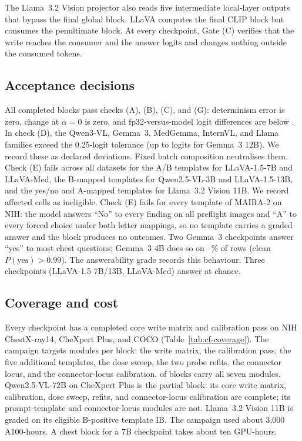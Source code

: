 \documentclass{article}
\begin{document}
The Llama~3.2 Vision projector also reads five intermediate local-layer outputs that bypass the final global block. LLaVA computes the final CLIP block but consumes the penultimate block. At every checkpoint, Gate (C) verifies that the write reaches the consumer and the answer logits and changes nothing outside the consumed tokens.

\subsection{Acceptance decisions}
\label{app:cf-gates}

All \cfWriteBlocks{} completed blocks pass checks (A), (B), (C), and (G): determinism error is zero, change at $\alpha=0$ is zero, and fp32-versus-model logit differences are below \cfGateFpMax{}. In check (D), the Qwen3-VL, Gemma~3, MedGemma, InternVL, and Llama families exceed the 0.25-logit tolerance (up to \cfGateBatchMax{} logits for Gemma~3 12B). We record these as declared deviations. Fixed batch composition neutralises them. Check (E) fails across all datasets for the A/B templates for LLaVA-1.5-7B and LLaVA-Med, the B-mapped templates for Qwen2.5-VL-3B and LLaVA-1.5-13B, and the yes/no and A-mapped templates for Llama~3.2 Vision 11B. We record affected cells as ineligible. Check (E) fails for every template of MAIRA-2 \citep{bannur2024maira} on NIH: the model answers ``No'' to every finding on all \cfSpecUngradedRows{} preflight images and ``A'' to every forced choice under both letter mappings, so no template carries a graded answer and the block produces no outcomes. Two Gemma~3 checkpoints answer ``yes'' to most chest questions; Gemma~3 4B does so on \cfGemmaFourYesMin--\cfGemmaFourYesMax\% of rows (clean $P(\mathrm{yes})>0.99$). The answerability grade records this behaviour. Three checkpoints (LLaVA-1.5 7B/13B, LLaVA-Med) answer at chance.

\subsection{Coverage and cost}
\label{app:cf-coverage}

Every checkpoint has a completed core write matrix and calibration pass on NIH ChestX-ray14, CheXpert Plus, and COCO (Table~\ref{tab:cf-coverage}). The campaign targets \cfCoveragePlannedWord{} modules per block: the write matrix, the calibration pass, the five additional templates, the dose sweep, the two probe refits, the connector locus, and the connector-locus calibration. \cfCoverageBlocksAllSeven{} of \cfBlocks{} blocks carry all seven modules. Qwen2.5-VL-72B on CheXpert Plus is the partial block: its core write matrix, calibration, dose sweep, refits, and connector-locus calibration are complete; its prompt-template and connector-locus modules are not. Llama~3.2 Vision 11B is graded on its eligible B-positive template IB. The campaign used about 3,000 A100-hours. A chest block for a 7B checkpoint takes about ten GPU-hours.
\end{document}
